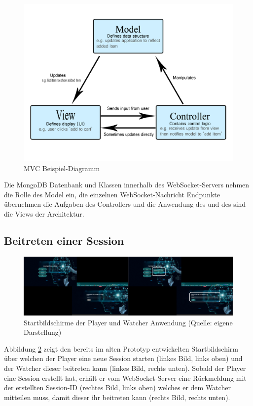 \begin{figure}[ht]
\centering
\includegraphics[width=1\linewidth]{content/pictures/mvc-architecture.png}
\caption{\ac{MVC} Beispiel-Diagramm \cite{noauthor_mvc_2023}}
\label{fig:mvc-diagramm}
\end{figure}

Die MongoDB Datenbank und Klassen innerhalb des WebSocket-Servers nehmen die Rolle des Model ein, die einzelnen WebSocket-Nachricht Endpunkte übernehmen die Aufgaben des Controllers und die Anwendung des  und des  sind die Views der Architektur.

\subsection{Beitreten einer Session}

\begin{figure}[ht]
\centering
\includegraphics[width=1\linewidth]{content/pictures/Login_Login_by_ID.png}
\caption{Startbildschirme der Player und Watcher Anwendung (Quelle: eigene Darstellung)}
\label{fig:old-logins}
\end{figure}

Abbildung \ref{fig:old-logins} zeigt den bereits im alten Prototyp entwickelten Startbildschirm über welchen der Player eine neue Session starten (linkes Bild, links oben) und der Watcher dieser beitreten kann (linkes Bild, rechts unten). Sobald der Player eine Session erstellt hat, erhält er vom WebSocket-Server eine Rückmeldung mit der erstellten Session-ID (rechtes Bild, links oben) welches er dem Watcher mitteilen muss, damit dieser ihr beitreten kann (rechts Bild, rechts unten).

